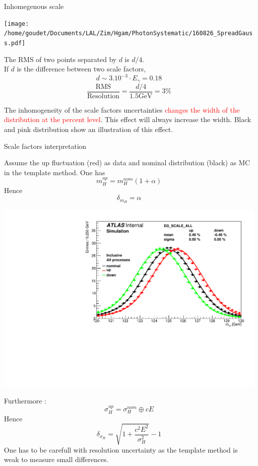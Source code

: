 \begin{frame}{Inhomegenous scale}
  \begin{minipage}{0.49\linewidth}\texttt{[image: /home/goudet/Documents/LAL/Zim/Hgam/PhotonSystematic/160826\_SpreadGauss.pdf]}\end{minipage}
  \hfill
  \begin{minipage}{0.49\linewidth}
    The RMS of two points separated by $d$ is $d/4$.\\
    If $d$ is the difference between two scale factors, $$d\sim 3.10^{-3} \cdot E_\gamma=0.18$$
   $$\frac{\text{RMS}}{\text{Resolution}} = \frac{d/4}{1.5\text{GeV}} = 3\%$$
  \end{minipage}
\vfill
  The inhomogeneity of the scale factors uncertainties \textcolor{red}{changes the width of the distribution at the percent level}.
  This effect will always increase the width.  
  \vfill
  Black and pink distribution show an illustration of this effect.
\end{frame}

\begin{frame}{Scale factors interpretation}
  \begin{minipage}{0.49\linewidth}
    Assume the up fluctuation (red) as data and nominal distribution (black) as MC in the template method.
    One has
    $$m_H^{up}=m_H^{nom}(1+\alpha)$$
    Hence
    $$\delta_{m_H}=\alpha$$
    \end{minipage}
  \begin{minipage}{0.49\linewidth}
    \includegraphics[width=\linewidth]{Figures/h013_EG_SCALE_ALL_0.pdf}
  \end{minipage}
  Furthermore :
  $$\sigma_H^{up}=\sigma_H^{nom} \oplus cE$$
  Hence
  $$\delta_{\sigma_H} = \sqrt{1+\frac{c^2E^2}{\sigma_H^2}}-1$$
  One has to be carefull with resolution uncertainty as the template method is weak to measure small differences.
\end{frame}

